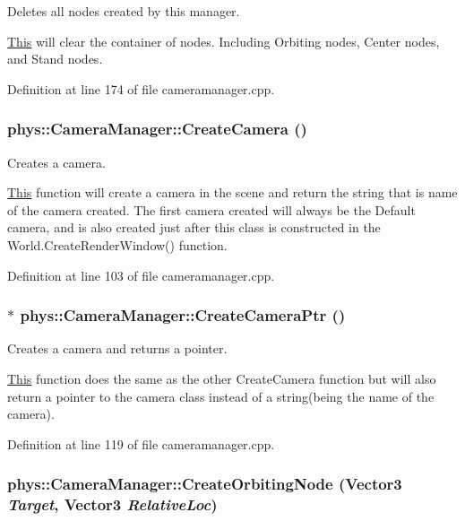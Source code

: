 Deletes all nodes created by this manager. 

\hyperlink{structThis}{This} will clear the container of nodes. Including Orbiting nodes, Center nodes, and Stand nodes. 

Definition at line 174 of file cameramanager.cpp.

\hypertarget{classphys_1_1CameraManager_ac6ff80c91fa5a2cd21ebd8b78db9add2}{
\subsubsection[{CreateCamera}]{ phys::CameraManager::CreateCamera ()}}
\label{d9/d91/classphys_1_1CameraManager_ac6ff80c91fa5a2cd21ebd8b78db9add2}


Creates a camera. 

\hyperlink{structThis}{This} function will create a camera in the scene and return the string that is name of the camera created. The first camera created will always be the Default camera, and is also created just after this class is constructed in the World.CreateRenderWindow() function. 

Definition at line 103 of file cameramanager.cpp.

\hypertarget{classphys_1_1CameraManager_ae51f79b63b5c34959bc4cfbef34b8f08}{
\subsubsection[{CreateCameraPtr}]{ $\ast$ phys::CameraManager::CreateCameraPtr ()}}
\label{d9/d91/classphys_1_1CameraManager_ae51f79b63b5c34959bc4cfbef34b8f08}


Creates a camera and returns a pointer. 

\hyperlink{structThis}{This} function does the same as the other CreateCamera function but will also return a pointer to the camera class instead of a string(being the name of the camera). 

Definition at line 119 of file cameramanager.cpp.

\hypertarget{classphys_1_1CameraManager_a9a696ea09f174a69bbc6d0bb179b3de4}{
\subsubsection[{CreateOrbitingNode}]{ phys::CameraManager::CreateOrbitingNode ({\bf Vector3} {\em Target}, \/  {\bf Vector3} {\em RelativeLoc})}}
\label{d9/d91/classphys_1_1CameraManager_a9a696ea09f174a69bbc6d0bb179b3de4}


